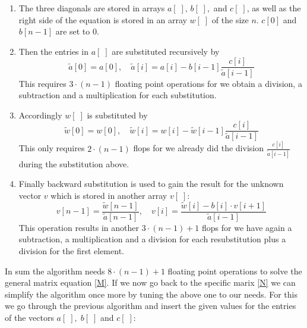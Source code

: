 \documentclass[11pt,a4wide]{article}
\begin{document}
\begin{enumerate}
	\item  The three diagonals are stored in arrays $a[\;],\,b[\;],$ and $c[\;]$, as well as the right side of the equation is stored in an array $w[\;]$ of the size $n$. $c[0]$ and $b[n-1]$ are set to 0.
	\item	Then the entries in $a[\;]$ are substituted recursively by
	\begin{equation}
	\tilde{a}[0]=a[0],\quad \tilde{a}[i]=a[i]-b[i-1]\dfrac{c[i]}{\tilde{a}[i-1]}
	\label{eq:3}
	\end{equation}
	This requires $3\cdot (n-1)$ floating point operations for we obtain a division, a subtraction and a multiplication for each substitution.
	\item Accordingly $w[\;]$ is substituted by
		\begin{equation}
	\tilde{w}[0]=w[0],\quad \tilde{w}[i]=w[i]-\tilde{w}[i-1]\dfrac{c[i]}{\tilde{a}[i-1]}
	\label{eq:4}
	\end{equation}
	This only requires $2\cdot (n-1)$ flops for we already did the division $\frac{c[i]}{\tilde{a}[i-1]}$ during the substitution above.
	\item Finally backward substitution is used to gain the result for the unknown vector $v$ which is stored in another array $v[\;]$:
		\begin{equation}
	v[n-1]=\dfrac{\tilde{w}[n-1]}{\tilde{a}[n-1]},\quad v[i]=\dfrac{\tilde{w}[i]-b[i]\cdot v[i+1]}{\tilde{a}[i-1]}
	\label{eq:5}
	\end{equation}
	This operation results in another $3\cdot(n-1)+1$ flops for we have again a subtraction, a multiplication and a division for each resubstitution plus a division for the first element.
\end{enumerate}
In sum the algorithm needs $8\cdot(n-1)+1$ floating point operations to solve the general matrix equation \ref{M}. 
If we now go back to the specific marix \ref{N} we can simplify the algorithm once more by tuning the above one to our needs.  For this we go through the previous algorithm and insert the given values for the entries of the vectors $a[\;],\;b[\;]$ and $c[\;]$:
\end{document}
